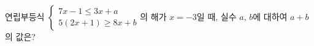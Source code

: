 연립부등식 $\begin{cases} 7x-1\le 3x+a \\ 5(2x+1)\ge 8x+b \end{cases}$의 해가 $x=-3$일 때, 실수 $a$, $b$에 대하여 $a+b$의 값은?
